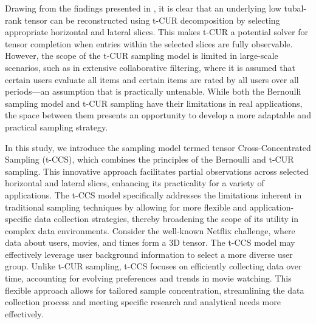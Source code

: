 \documentclass[twoside,12pt]{article}
\begin{document}
Drawing from the findings presented in , it is clear that an underlying low tubal-rank tensor can be reconstructed using t-CUR decomposition by selecting appropriate horizontal and lateral slices. This makes t-CUR a potential solver for tensor completion when entries within the selected slices are fully observable. However, the scope of the t-CUR sampling model is limited in large-scale scenarios, such as in extensive collaborative filtering, where it is assumed that certain users evaluate all items and certain items are rated by all users over all periods—an assumption that is practically untenable. While both the Bernoulli sampling model and t-CUR sampling have their limitations in real applications, the space between them presents an opportunity to develop a more adaptable and practical sampling strategy. 

In this study, we introduce the sampling model termed tensor Cross-Concentrated Sampling (t-CCS), which combines the principles of the Bernoulli  and t-CUR sampling. This innovative approach facilitates partial observations across selected horizontal and lateral slices, enhancing its practicality for a variety of applications. The t-CCS model specifically addresses the limitations inherent in traditional sampling techniques by allowing for more flexible and application-specific data collection strategies, thereby broadening the scope of its utility in complex data environments. Consider the well-known Netflix challenge, where data about users, movies, and times form a 3D tensor. The t-CCS model may effectively leverage user background information to select a more diverse user group. Unlike t-CUR sampling, t-CCS focuses on efficiently collecting data over time, accounting for evolving preferences and trends in movie watching. This flexible approach allows for tailored sample concentration, streamlining the data collection process and meeting specific research and analytical needs more effectively.
\vspace{-5mm}
\end{document}
